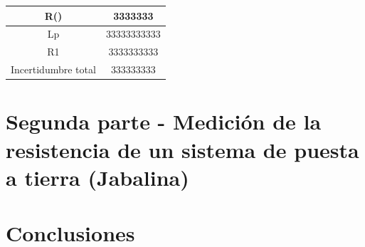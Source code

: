 \documentclass[12pt, letterpaper]{article}
\begin{document}
\begin{center}
\begin{tabular}{|c|c|}
\hline
R()                 & 3333333     \\ \hline
Lp                  & 33333333333 \\ \hline
R1                  & 3333333333  \\ \hline
Incertidumbre total & 333333333   \\ \hline
\end{tabular}
\end{center}

	
	\section{Segunda parte - Medición de la resistencia de un sistema de puesta a tierra (Jabalina)}

\section{Conclusiones}




\label{LastPage}
\end{document}
